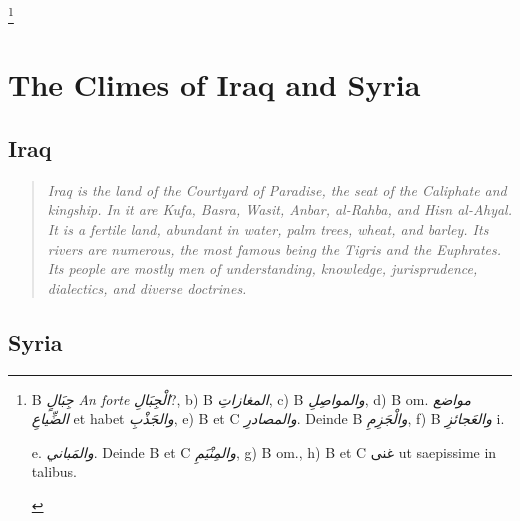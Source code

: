 \documentclass[11pt,a4paper]{article}
\newcommand{\variants}[1]{\footnote{\small\textcolor{footnotecolor}{#1}}}
\begin{document}
\variants{B \textit{جِبَالٍ} \textit{An forte} \textit{الْجِبَالِ}?, b) B \textit{المغازاتِ}, c) B \textit{والمواصِلِ}, d) B om. \textit{مواضع الضِّياعِ} et habet \textit{والجَذْبِ}, e) B et C \textit{والمصادرِ}. Deinde B \textit{والْجَزِمِ}, f) B \textit{والعَجائزِ} i.

e. \textit{والمَباني}. Deinde B et C \textit{والمِنْيَمِ}, g) B om., h) B et C غنى ut saepissime in talibus.}

\clearpage


\section{The Climes of Iraq and Syria}

\subsection{Iraq}

{\small\arabicfont
{}}

\bigskip

\begin{quote}
\small
\textit{Iraq is the land of the Courtyard of Paradise, the seat of the Caliphate and kingship. In it are Kufa, Basra, Wasit, Anbar, al-Rahba, and Hisn al-Ahyal. It is a fertile land, abundant in water, palm trees, wheat, and barley. Its rivers are numerous, the most famous being the Tigris and the Euphrates. Its people are mostly men of understanding, knowledge, jurisprudence, dialectics, and diverse doctrines.}
\end{quote}

\vspace{0.5cm}

\subsection{Syria}
\end{document}
